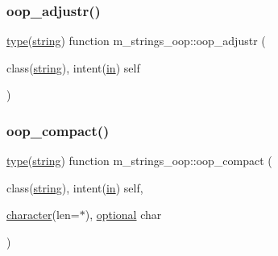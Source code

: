 \mbox{\label{namespacem__strings__oop_abb0dfa5646259e4fc768700eada111ac}} 
\subsubsection{\texorpdfstring{oop\+\_\+adjustr()}{oop\_adjustr()}}
{\footnotesize\ttfamily \hyperlink{stop__watch_83_8txt_a70f0ead91c32e25323c03265aa302c1c}{type}(\hyperlink{structm__strings__oop_1_1string}{string}) function m\+\_\+strings\+\_\+oop\+::oop\+\_\+adjustr (\begin{DoxyParamCaption}\item[{class(\hyperlink{structm__strings__oop_1_1string}{string}), intent(\hyperlink{M__journal_83_8txt_afce72651d1eed785a2132bee863b2f38}{in})}]{self }\end{DoxyParamCaption})\hspace{0.3cm}{\ttfamily [private]}}

\mbox{\label{namespacem__strings__oop_ac02aecbaebcf57833b544de4f50c89a6}} 
\subsubsection{\texorpdfstring{oop\+\_\+compact()}{oop\_compact()}}
{\footnotesize\ttfamily \hyperlink{stop__watch_83_8txt_a70f0ead91c32e25323c03265aa302c1c}{type}(\hyperlink{structm__strings__oop_1_1string}{string}) function m\+\_\+strings\+\_\+oop\+::oop\+\_\+compact (\begin{DoxyParamCaption}\item[{class(\hyperlink{structm__strings__oop_1_1string}{string}), intent(\hyperlink{M__journal_83_8txt_afce72651d1eed785a2132bee863b2f38}{in})}]{self,  }\item[{\hyperlink{option__stopwatch_83_8txt_abd4b21fbbd175834027b5224bfe97e66}{character}(len=$\ast$), \hyperlink{option__stopwatch_83_8txt_aa4ece75e7acf58a4843f70fe18c3ade5}{optional}}]{char }\end{DoxyParamCaption})\hspace{0.3cm}{\ttfamily [private]}}

